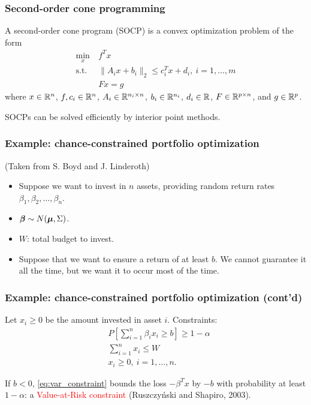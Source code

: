 \documentclass[aspectratio=169]{beamer}
\begin{document}
\begin{frame}
\frametitle{Second-order cone programming}

A second-order cone program (SOCP) is a convex optimization problem of the form
\begin{align*}
\min_x \ & f^T x \\
\text{s.t. } &
\| A_i x + b_i \|_2 \leq c_i^T x + d_i,\ i = 1,\ldots,m \\
& F x = g
\end{align*}
where $x \in {\mathbb{R}}^n$, $f, c_i \in {\mathbb{R}}^n$, $A_i \in {\mathbb{R}}^{n_i \times n}$, $b_i \in {\mathbb{R}}^{n_i}$, $d_i \in {\mathbb{R}}$, $F \in {\mathbb{R}}^{p \times n}$, and $g \in {\mathbb{R}}^p$.

\smallskip

SOCPs can be solved efficiently by interior point methods.

\end{frame}

\begin{frame}
\frametitle{Example: chance-constrained portfolio optimization}

(Taken from S. Boyd and J. Linderoth)

\begin{itemize}
	\item 
Suppose we want to invest in $n$ assets, providing random return rates $\beta_1, \beta_2,\ldots, \beta_n$.
\item
${\boldsymbol{\beta}} \sim N({\boldsymbol{\mu}}, \Sigma)$.
\item
$W$: total budget to invest.
\item
Suppose that we want to ensure a return of at least $b$.
We cannot guarantee it all the time, but we want it to occur most of the time.
\end{itemize}

\end{frame}

\begin{frame}
\frametitle{Example: chance-constrained portfolio optimization (cont'd)}

Let $x_i \geq 0$ be the amount invested in asset $i$.
Constraints:
\begin{align}
& P\left[ \sum_{i = 1}^n \beta_i x_i \geq b  \right] \geq 1-\alpha \label{eq:var_constraint} \\
& \sum_{i = 1}^n x_i \leq W \nonumber \\
& x_i \geq 0,\ i = 1,\ldots,n.  \nonumber
\end{align}

\smallskip

If $b < 0$, \eqref{eq:var_constraint} bounds the loss $-\beta^Tx$ by $-b$ with probability at least $1-\alpha$: a \textcolor{red}{Value-at-Risk constraint} (Ruszczyński and Shapiro, 2003).

\end{frame}
\end{document}
